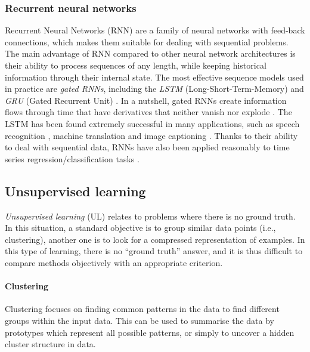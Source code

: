 \subsubsection{Recurrent neural networks} \label{Recurrent Neural Network}

Recurrent Neural Networks (RNN) \citep{rumelhart1986learning} are a family of neural networks with feed-back connections, which makes them suitable for dealing with sequential problems. The main advantage of RNN compared to other neural network architectures is their ability to process sequences of any length, while keeping historical information through their internal state. The most effective sequence models used in practice are \textit{gated RNNs}, including the \textit{LSTM} (Long-Short-Term-Memory) \citep{hochreiter1997long} and \textit{GRU} (Gated Recurrent Unit) \citep{cho2014properties}. In a nutshell, gated RNNs create information flows through time that have derivatives that neither vanish nor explode \citep{goodfellow2016deep}. The LSTM has been found extremely successful in many applications, such as speech recognition \citep{graves2013hybrid,graves2014towards}, machine translation \citep{sutskever2014sequence} and image captioning \citep{kiros2014unifying,vinyals2015show,xu2015show}. Thanks to their ability to deal with sequential data, RNNs have also been applied reasonably to time series regression/classification tasks \citep{smirnov2018time}.  

\subsection{Unsupervised learning}

\textit{Unsupervised learning} (UL) relates to problems where there is no ground truth. In this situation, a standard objective is to group similar data points (i.e., clustering), another one is to look for a compressed representation of examples.
In this type of learning, there is no ``ground truth'' answer, and it is thus difficult to compare methods objectively with an appropriate criterion.

\paragraph{Clustering}

Clustering focuses on finding common patterns in the data to find different groups within the input data. This can be used to summarise  the data by prototypes which represent all possible patterns, or simply to uncover a hidden cluster structure in data.

